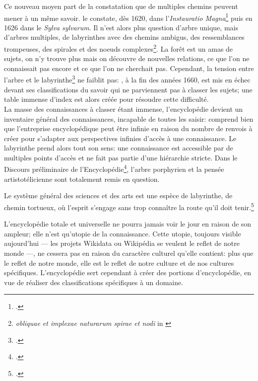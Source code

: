 Ce nouveau moyen part de la constatation que de multiples chemins peuvent mener à un même savoir.  le constate, dès 1620, dans l'\textit{Instauratio Magna}\footcite{bacon_instauratio_1620} puis en 1626 dans le \textit{Sylva sylvarum}. Il n'est alors plus question d'arbre unique, mais d'arbres multiples, de labyrinthes avec des chemins ambigus, des ressemblances trompeuses, des spirales et des noeuds complexes\footnote{\og \textit{obliquae et implexae naturarum spirae et nodi}\fg{} in \cite{bacon_instauratio_1620}}. La forêt est un amas de sujets, on n'y trouve plus mais on découvre de nouvelles relations, ce que l'on ne connaissait pas encore et ce que l'on ne cherchait pas. Cependant, la \og tension entre l'arbre et le labyrinthe\fg{}\footcite{eco_arbre_2010} ne faiblit pas: , à la fin des années 1660, est mis en échec devant ses classifications du savoir qui ne parviennent pas à classer les sujets; une table immense d'index est alors créée pour résoudre cette difficulté.\\

La masse des connaissances à classer étant immense, l'encyclopédie devient un inventaire général des connaissances, incapable de toutes les saisir:  comprend bien que l'entreprise encyclopédique peut être infinie en raison du nombre de renvois à créer pour s'adapter aux perspectives infinies d'accès à une connaissance. Le labyrinthe prend alors tout son sens: une connaissance est accessible par de multiples points d'accès et ne fait pas partie d'une hiérarchie stricte. Dans le \og Discours préliminaire\fg{} de l'Encyclopédie\footcite{diderot_encyclope_1751}, l'arbre porphyrien et la pensée artistotélicienne sont totalement remis en question. 
\begin{citationLongue}
	Le système général des sciences et des arts est une espèce de labyrinthe, de chemin tortueux, où l'esprit s'engage sans trop connaître la route qu'il doit tenir.\footcite[Discours préliminaire]{diderot_encyclope_1751}
\end{citationLongue}
L'encyclopédie totale et universelle ne pourra jamais voir le jour en raison de son ampleur; elle n'est qu'utopie de la connaissance. Cette utopie, toujours visible aujourd'hui --- les projets Wikidata ou Wikipédia se veulent le reflet de notre monde ---, ne cessera pas en raison du caractère culturel qu'elle contient: plus que le reflet de notre monde, elle est le reflet de notre culture et de nos cultures spécifiques. L'encyclopédie sert cependant à créer des portions d'encyclopédie, en vue de réaliser des classifications spécifiques à un domaine.

